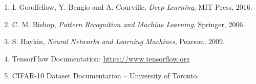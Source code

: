 \documentclass[11pt]{article}
\begin{document}
\begin{enumerate}
\item I. Goodfellow, Y. Bengio and A. Courville, \emph{Deep Learning}, MIT Press, 2016.
\item C. M. Bishop, \emph{Pattern Recognition and Machine Learning}, Springer, 2006.
\item S. Haykin, \emph{Neural Networks and Learning Machines}, Pearson, 2009.
\item TensorFlow Documentation: \url{https://www.tensorflow.org}
\item CIFAR-10 Dataset Documentation -- University of Toronto.
\end{enumerate}
\end{document}
